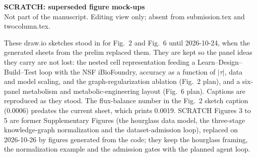 \begin{center}
{\large\bfseries\color{stred}SCRATCH: superseded figure mock-ups}\\[2pt]
{\small\color{stred}Not part of the manuscript. Editing view only; absent from submission.tex and twocolumn.tex.}
\end{center}
\noindent These draw.io sketches stood in for Fig.~2 and Fig.~6 until 2026-10-24, when the
generated sheets from the prelim replaced them. They are kept so the panel ideas they carry
are not lost: the nested cell representation feeding a Learn--Design--Build--Test loop with
the NSF iBioFoundry, accuracy as a function of $|\tau|$, data and model scaling, and the
graph-regularization ablation (Fig.~2 plan), and a six-panel metabolism and
metabolic-engineering layout (Fig.~6 plan). Captions are reproduced as they stood. The
flux-balance number in the Fig.~2 sketch caption (0.0006) predates the current sheet, which
prints 0.0019. SCRATCH Figures 3 to 5 are former Supplementary Figures (the hourglass data model,
the three-stage knowledge-graph normalization and the dataset-admission loop), replaced on
2026-10-26 by figures generated from the code; they keep the hourglass framing, the normalization
example and the admission gates with the planned agent loop.
\clearpage %

\begin{figure}[t]
\end{figure}
\FloatBarrier


